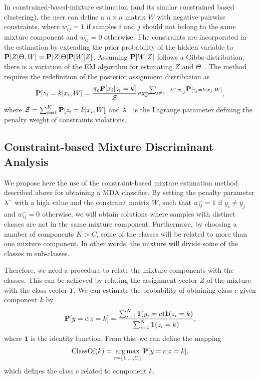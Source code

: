 \documentclass[runningheads,a4paper]{llncs}
\newcommand{\Prob}{\mbox{\bf P}}
\DeclareMathOperator*{\argmax}{arg\,max}
\begin{document}
In constrained-based-mixture estimation (and its similar constrained
based clustering), the user can define a $n \times n$ matrix $W$ with
negative pairwise constraints, where $w^-_{ij}=1$ if samples $i$ and
$j$ should not belong to the same mixture component and $w^-_{ij}=0$
otherwise. The constraints are incorporated in the estimation by
extending the prior probability of the hidden variable to
$\Prob[Z|\Theta,W]=\Prob[Z|\Theta]\Prob[W|Z]$. Assuming $\Prob[W|Z]$
follows a Gibbs distribution, there is a variation of the EM algorithm
for estimating $Z$ and $\Theta$~\cite{Lange2005,Lu2005}. The method
requires the redefinition of the posterior assignment distribution as
\begin{equation}
\Prob[z_i=k|x_i,W] = \frac{\pi_c \Prob[x_i|z_i=k]}{\mathcal{Z}} \exp^{\sum_{j \neq i} -\lambda^- w^-_{ij} \Prob[z_j=k|x_j,W]},
\label{eq:posterior}
\end{equation}
where $\mathcal{Z}=\sum_{k=1}^K\Prob[z_i=k|x_i,W]$ and $\lambda^-$ is
the Lagrange parameter defining the penalty weight of constraints
violations.

\subsection{Constraint-based Mixture Discriminant Analysis}

We propose here the use of the constraint-based mixture estimation
method described above for obtaining a MDA classifier. By setting the
penalty parameter $\lambda^-$ with a high value and the constraint
matrix $W$, such that $w^-_{ij}=1$ if $y_i \neq y_j$ and $w^-_{ij}=0$
otherwise, we will obtain solutions where samples with distinct
classes are not in the same mixture component. Furthermore, by
choosing a number of components $K>C$, some of the classes will be
related to more than one mixture component. In other words, the
mixture will divide some of the classes in sub-classes.

Therefore, we need a procedure to relate the mixture components with
the classes.  This can be achieved by relating the assignment vector
$Z$ of the mixture with the class vector $Y$. We can estimate the
probability of obtaining class $c$ given component $k$ by
\begin{equation}
\Prob[y=c|z=k]=\frac{\sum_{i=1}^N \mathbf{1}(y_i=c) \mathbf{1}(z_i=k)}{\sum_{i=1}^N \mathbf{1}(z_i=k)},
\label{eq:component}
\end{equation}
where $\mathbf{1}$ is the identity function. From this, we can define
the mapping
\begin{equation}  
\mbox{ClassOf}(k) =\argmax_{c=\{1,...,C\}} \Prob[y=c|z=k],
\label{eq:classcomponent}
\end{equation}
which defines the class $c$ related to component $k$. 
\end{document}

